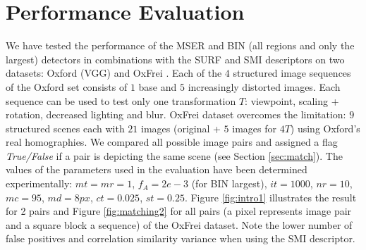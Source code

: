 \documentclass[a4paper,11pt]{article}
\begin{document}
\section{Performance Evaluation}

We have tested the performance of the MSER and BIN (all regions and only the largest) detectors in combinations with the SURF and SMI descriptors on two datasets: Oxford (VGG) \cite{Mikolajczyk:2005} and OxFrei \cite{Ranguelova2016AICCSA}. Each of the $4$ structured image sequences of the Oxford set consists of $1$ base and $5$ increasingly distorted images. Each sequence can be used to test only one transformation $T$: viewpoint, scaling + rotation, decreased lighting and blur. OxFrei dataset overcomes the limitation: $9$ structured scenes each with $21$ images (original + $5$ images for $4 T$) using Oxford's real homographies. We compared all possible image pairs and assigned a flag {\em True/False} if a pair is depicting the same scene (see Section \ref{sec:match}). The values of the parameters used in the evaluation have been determined experimentally: $\mathit{mt}=\mathit{mr}=1$, $f_A=2e-3$ (for BIN largest), $\mathit{it}=1000$, $\mathit{nr}=10$, $\mathit{mc}=95$, $\mathit{md}=8px$, $\mathit{ct}=0.025$, $\mathit{st}=0.25$. Figure \ref{fig:intro1} illustrates the result for 2 pairs and Figure \ref{fig:matching2} for all pairs (a pixel represents image pair and a square block a sequence) of the OxFrei dataset. Note the lower number of false positives and correlation similarity variance when using the SMI descriptor.
\end{document}
